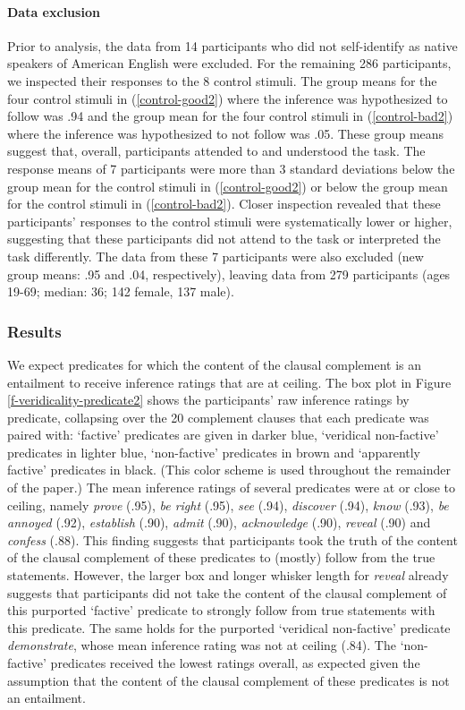 \documentclass[11pt,fleqn]{article}
\newcommand{\6}{\mbox{$[\hspace*{-.6mm}[$}}
\newcommand{\9}{\mbox{$]\hspace*{-.6mm}]$}}
\begin{document}
\paragraph{Data exclusion}
Prior to analysis, the data from 14 participants who did not self-identify as native speakers of American English were excluded. For the remaining 286 participants, we inspected their responses to the 8 control stimuli. The group means for the four control stimuli in (\ref{control-good2}) where the inference was hypothesized to follow was .94 and the group mean for the four control stimuli in (\ref{control-bad2}) where the inference was hypothesized to not follow was .05. These group means suggest that, overall, participants attended to and understood the task. The response means of 7 participants were more than 3 standard deviations below the group mean for the control stimuli in (\ref{control-good2}) or below the group mean for the control stimuli in (\ref{control-bad2}). Closer inspection revealed that these participants' responses to the control stimuli were systematically lower or higher, suggesting that these participants did not attend to the task or interpreted the task differently. The data from these 7 participants were also excluded (new group means: .95 and .04, respectively), leaving data from 279 participants (ages 19-69; median: 36; 142 female, 137 male).

\subsubsection{Results}

We expect predicates for which the content of the clausal complement is an entailment to receive inference ratings that are at ceiling. The box plot in Figure \ref{f-veridicality-predicate2} shows the participants' raw inference ratings by predicate, collapsing over the 20 complement clauses that each predicate was paired with: `factive' predicates are given in darker blue, `veridical non-factive' predicates in lighter blue, `non-factive' predicates in brown and `apparently factive' predicates in black. (This color scheme is used throughout the remainder of the paper.) The mean inference ratings of several predicates were at or close to ceiling, namely {\em prove} (.95), {\em be right} (.95), {\em see} (.94), {\em discover} (.94), {\em know} (.93), {\em be annoyed} (.92), {\em establish} (.90), {\em admit} (.90), {\em acknowledge} (.90), {\em reveal} (.90) and {\em confess} (.88). This finding suggests that participants took the truth of the content of the clausal complement of these predicates to (mostly) follow from the true statements. However, the larger box and longer whisker length for {\em reveal} already suggests that participants did not take the content of the clausal complement of this purported `factive' predicate to strongly follow from true statements with this predicate. The same holds for the purported `veridical non-factive' predicate {\em demonstrate}, whose mean inference rating was not at ceiling (.84). The `non-factive' predicates received the lowest ratings overall, as expected given the assumption that the content of the clausal complement of these predicates is not an entailment.
\end{document}
